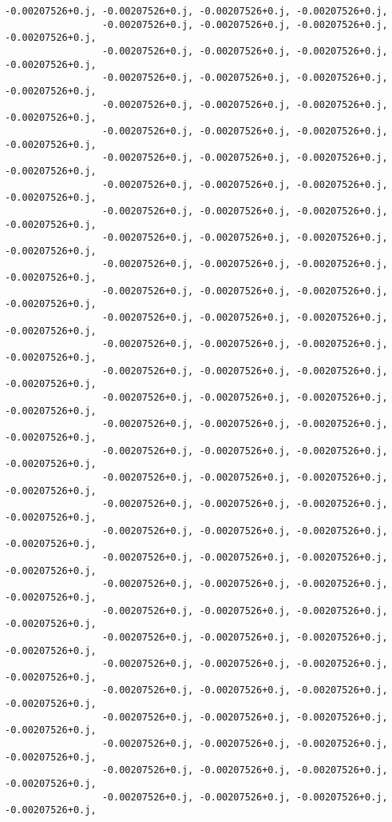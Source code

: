 \documentclass[11pt]{article}
\begin{document}
\begin{Verbatim}[commandchars=\\\{\}]
                 -0.00207526+0.j, -0.00207526+0.j, -0.00207526+0.j, -0.00207526+0.j,
                 -0.00207526+0.j, -0.00207526+0.j, -0.00207526+0.j, -0.00207526+0.j,
                 -0.00207526+0.j, -0.00207526+0.j, -0.00207526+0.j, -0.00207526+0.j,
                 -0.00207526+0.j, -0.00207526+0.j, -0.00207526+0.j, -0.00207526+0.j,
                 -0.00207526+0.j, -0.00207526+0.j, -0.00207526+0.j, -0.00207526+0.j,
                 -0.00207526+0.j, -0.00207526+0.j, -0.00207526+0.j, -0.00207526+0.j,
                 -0.00207526+0.j, -0.00207526+0.j, -0.00207526+0.j, -0.00207526+0.j,
                 -0.00207526+0.j, -0.00207526+0.j, -0.00207526+0.j, -0.00207526+0.j,
                 -0.00207526+0.j, -0.00207526+0.j, -0.00207526+0.j, -0.00207526+0.j,
                 -0.00207526+0.j, -0.00207526+0.j, -0.00207526+0.j, -0.00207526+0.j,
                 -0.00207526+0.j, -0.00207526+0.j, -0.00207526+0.j, -0.00207526+0.j,
                 -0.00207526+0.j, -0.00207526+0.j, -0.00207526+0.j, -0.00207526+0.j,
                 -0.00207526+0.j, -0.00207526+0.j, -0.00207526+0.j, -0.00207526+0.j,
                 -0.00207526+0.j, -0.00207526+0.j, -0.00207526+0.j, -0.00207526+0.j,
                 -0.00207526+0.j, -0.00207526+0.j, -0.00207526+0.j, -0.00207526+0.j,
                 -0.00207526+0.j, -0.00207526+0.j, -0.00207526+0.j, -0.00207526+0.j,
                 -0.00207526+0.j, -0.00207526+0.j, -0.00207526+0.j, -0.00207526+0.j,
                 -0.00207526+0.j, -0.00207526+0.j, -0.00207526+0.j, -0.00207526+0.j,
                 -0.00207526+0.j, -0.00207526+0.j, -0.00207526+0.j, -0.00207526+0.j,
                 -0.00207526+0.j, -0.00207526+0.j, -0.00207526+0.j, -0.00207526+0.j,
                 -0.00207526+0.j, -0.00207526+0.j, -0.00207526+0.j, -0.00207526+0.j,
                 -0.00207526+0.j, -0.00207526+0.j, -0.00207526+0.j, -0.00207526+0.j,
                 -0.00207526+0.j, -0.00207526+0.j, -0.00207526+0.j, -0.00207526+0.j,
                 -0.00207526+0.j, -0.00207526+0.j, -0.00207526+0.j, -0.00207526+0.j,
                 -0.00207526+0.j, -0.00207526+0.j, -0.00207526+0.j, -0.00207526+0.j,
                 -0.00207526+0.j, -0.00207526+0.j, -0.00207526+0.j, -0.00207526+0.j,
                 -0.00207526+0.j, -0.00207526+0.j, -0.00207526+0.j, -0.00207526+0.j,
                 -0.00207526+0.j, -0.00207526+0.j, -0.00207526+0.j, -0.00207526+0.j,
                 -0.00207526+0.j, -0.00207526+0.j, -0.00207526+0.j, -0.00207526+0.j,
                 -0.00207526+0.j, -0.00207526+0.j, -0.00207526+0.j, -0.00207526+0.j,
                 -0.00207526+0.j, -0.00207526+0.j, -0.00207526+0.j, -0.00207526+0.j,

\end{Verbatim}
\end{document}
